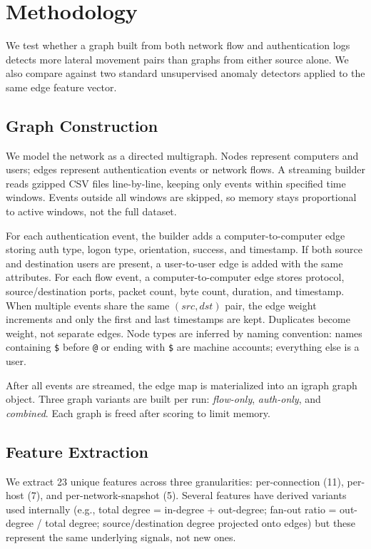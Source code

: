 \section{Methodology}

We test whether a graph built from both network flow and authentication logs detects more lateral movement pairs than graphs from either source alone. We also compare against two standard unsupervised anomaly detectors applied to the same edge feature vector.

\subsection{Graph Construction}

We model the network as a directed multigraph. Nodes represent computers and users; edges represent authentication events or network flows. A streaming builder reads gzipped CSV files line-by-line, keeping only events within specified time windows. Events outside all windows are skipped, so memory stays proportional to active windows, not the full dataset.

For each authentication event, the builder adds a computer-to-computer edge storing auth type, logon type, orientation, success, and timestamp. If both source and destination users are present, a user-to-user edge is added with the same attributes. For each flow event, a computer-to-computer edge stores protocol, source/destination ports, packet count, byte count, duration, and timestamp. When multiple events share the same $(src, dst)$ pair, the edge weight increments and only the first and last timestamps are kept. Duplicates become weight, not separate edges. Node types are inferred by naming convention: names containing \texttt{\$} before \texttt{@} or ending with \texttt{\$} are machine accounts; everything else is a user.

After all events are streamed, the edge map is materialized into an igraph graph object. Three graph variants are built per run: \emph{flow-only}, \emph{auth-only}, and \emph{combined}. Each graph is freed after scoring to limit memory.

\subsection{Feature Extraction}

We extract 23 unique features across three granularities: per-connection (11), per-host (7), and per-network-snapshot (5). Several features have derived variants used internally (e.g., total degree = in-degree + out-degree; fan-out ratio = out-degree / total degree; source/destination degree projected onto edges) but these represent the same underlying signals, not new ones.

